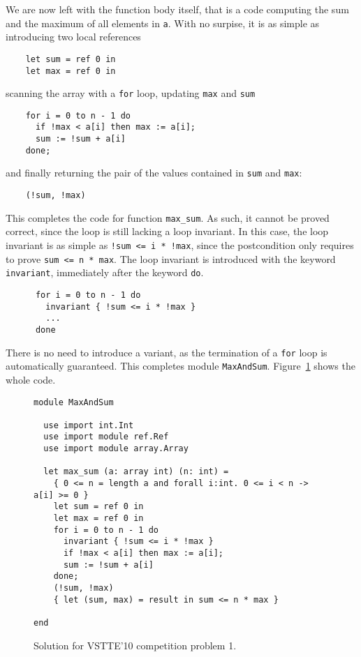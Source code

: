 We are now left with the function body itself, that is a code
computing the sum and the maximum of all elements in \texttt{a}. With
no surpise, it is as simple as introducing two local references
\begin{verbatim}
    let sum = ref 0 in
    let max = ref 0 in
\end{verbatim}
scanning the array with a \texttt{for} loop, updating \texttt{max}
and \texttt{sum}
\begin{verbatim}
    for i = 0 to n - 1 do
      if !max < a[i] then max := a[i];
      sum := !sum + a[i]
    done;
\end{verbatim}
and finally returning the pair of the values contained in \texttt{sum}
and \texttt{max}:
\begin{verbatim}
    (!sum, !max)
\end{verbatim}
This completes the code for function \texttt{max\_sum}.
As such, it cannot be proved correct, since the loop is still lacking
a loop invariant. In this case, the loop invariant is as simple as
\verb|!sum <= i * !max|, since the postcondition only requires to prove
\verb|sum <= n * max|. The loop invariant is introduced with the
keyword \texttt{invariant}, immediately after the keyword \texttt{do}.
\begin{verbatim}
      for i = 0 to n - 1 do
        invariant { !sum <= i * !max }
        ...
      done
\end{verbatim}
There is no need to introduce a variant, as the termination of a
\texttt{for} loop is automatically guaranteed.
This completes module \texttt{MaxAndSum}.
Figure~\ref{fig:MaxAndSum} shows the whole code.
\begin{figure}
  \centering
\begin{verbatim}
module MaxAndSum

  use import int.Int
  use import module ref.Ref
  use import module array.Array

  let max_sum (a: array int) (n: int) =
    { 0 <= n = length a and forall i:int. 0 <= i < n -> a[i] >= 0 }
    let sum = ref 0 in
    let max = ref 0 in
    for i = 0 to n - 1 do
      invariant { !sum <= i * !max }
      if !max < a[i] then max := a[i];
      sum := !sum + a[i]
    done;
    (!sum, !max)
    { let (sum, max) = result in sum <= n * max }

end
\end{verbatim}
\vspace*{-2em}\hrulefill
  \caption{Solution for VSTTE'10 competition problem 1.}
  \label{fig:MaxAndSum}
\end{figure}
